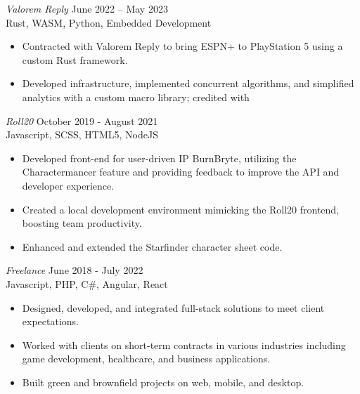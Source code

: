\documentclass[10pt]{res}
\begin{document}
\begin{resume}
		\vspace{4pt}
		{\sl Valorem Reply} \hfill June 2022 -- May 2023 \\ Rust, WASM, Python, Embedded
		Development
		\begin{itemize}
			\itemsep -2pt %

			\item Contracted with Valorem Reply to bring ESPN+ to PlayStation 5 using
				a custom Rust framework.

			\item Developed infrastructure, implemented concurrent algorithms, and simplified
				analytics with a custom macro library; credited with 
		\end{itemize}

		\vspace{4pt}
		{\sl Roll20} \hfill October 2019 - August 2021 \\ Javascript, SCSS, HTML5, NodeJS
		\begin{itemize}
			\itemsep -2pt %

			\item Developed front-end for user-driven IP BurnBryte, utilizing the
				Charactermancer feature and providing feedback to improve the API and
				developer experience.

			\item Created a local development environment mimicking the Roll20 frontend,
				boosting team productivity.

			\item Enhanced and extended the Starfinder character sheet code.
		\end{itemize}

		\vspace{4pt}
		{\sl Freelance} \hfill June 2018 - July 2022 \\ Javascript, PHP, C\#,
		Angular, React
		\begin{itemize}
			\itemsep -2pt %

			\item Designed, developed, and integrated full-stack solutions to meet client
				expectations.

			\item Worked with clients on short-term contracts in various industries including
				game development, healthcare, and business applications.

			\item Built green and brownfield projects on web, mobile, and desktop.
		\end{itemize}


\end{resume}
\end{document}
